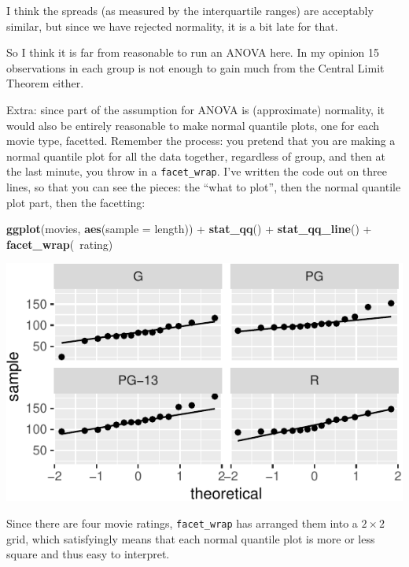 \documentclass[]{tufte-book}
\newenvironment{Shaded}{}{}
\newcommand{\DataTypeTok}[1]{\textcolor[rgb]{0.56,0.13,0.00}{#1}}
\newcommand{\KeywordTok}[1]{\textcolor[rgb]{0.00,0.44,0.13}{\textbf{#1}}}
\newcommand{\NormalTok}[1]{#1}
\newcommand{\OperatorTok}[1]{\textcolor[rgb]{0.40,0.40,0.40}{#1}}
\newcommand{\StringTok}[1]{\textcolor[rgb]{0.25,0.44,0.63}{#1}}
\theoremstyle{definition}
\theoremstyle{definition}
\theoremstyle{definition}
\theoremstyle{remark}
\begin{document}
I think the spreads (as measured by the interquartile ranges) are
acceptably similar, but since we have rejected normality, it is a bit
late for that.

So I think it is far from reasonable to run an ANOVA here. In my opinion
15 observations in each group is not enough to gain much from the
Central Limit Theorem either.

Extra: since part of the assumption for ANOVA is (approximate)
normality, it would also be entirely reasonable to make normal quantile
plots, one for each movie type, facetted. Remember the process: you
pretend that you are making a normal quantile plot for all the data
together, regardless of group, and then at the last minute, you throw in
a \texttt{facet\_wrap}. I've written the code out on three lines, so
that you can see the pieces: the ``what to plot'', then the normal
quantile plot part, then the facetting:

\begin{Shaded}
\begin{Highlighting}[]
\KeywordTok{ggplot}\NormalTok{(movies, }\KeywordTok{aes}\NormalTok{(}\DataTypeTok{sample =}\NormalTok{ length)) }\OperatorTok{+}\StringTok{ }\KeywordTok{stat_qq}\NormalTok{() }\OperatorTok{+}\StringTok{ }
\StringTok{    }\KeywordTok{stat_qq_line}\NormalTok{() }\OperatorTok{+}\StringTok{ }\KeywordTok{facet_wrap}\NormalTok{(}\OperatorTok{~}\NormalTok{rating)}
\end{Highlighting}
\end{Shaded}

\includegraphics{10-analysis-of-variance_files/figure-latex/unnamed-chunk-28-1}

Since there are four movie ratings, \texttt{facet\_wrap} has arranged
them into a \(2\times 2\) grid, which satisfyingly means that each
normal quantile plot is more or less square and thus easy to interpret.
\end{document}
